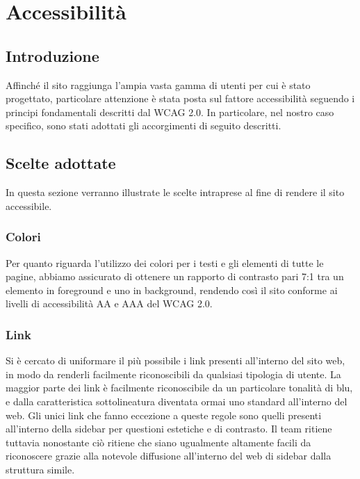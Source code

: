 \documentclass[12pt]{article}
\begin{document}
	\section{Accessibilità}
	\subsection{Introduzione}
	Affinché il sito raggiunga l'ampia vasta gamma di utenti per cui è stato progettato, particolare attenzione è stata posta sul fattore accessibilità seguendo i principi fondamentali descritti dal WCAG 2.0. In particolare, nel nostro caso specifico, sono stati adottati gli accorgimenti di seguito descritti.
	\subsection{Scelte adottate}
	In questa sezione verranno illustrate le scelte intraprese al fine di rendere il sito accessibile.
	\subsubsection{Colori}
	Per quanto riguarda l'utilizzo dei colori per i testi e gli elementi di tutte le pagine, abbiamo assicurato di ottenere un rapporto di contrasto pari 7:1 tra un elemento in foreground e uno in background, rendendo così il sito conforme ai livelli di accessibilità AA e AAA del WCAG 2.0. 
	\subsubsection{Link}
	Si è cercato di uniformare il più possibile i link presenti all'interno del sito web, in modo da renderli facilmente riconoscibili da qualsiasi tipologia di utente. La maggior parte dei link è facilmente riconoscibile da un particolare tonalità di blu, e dalla caratteristica sottolineatura diventata ormai uno standard all'interno del web. Gli unici link che fanno eccezione a queste regole sono quelli presenti all'interno della sidebar per questioni estetiche e di contrasto. Il team ritiene tuttavia nonostante ciò ritiene che siano ugualmente altamente facili da riconoscere grazie alla notevole diffusione all'interno del web di sidebar dalla struttura simile. 
\end{document}
